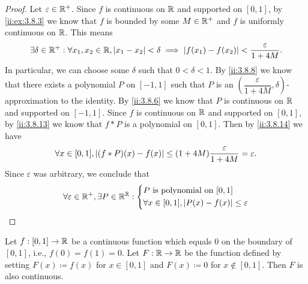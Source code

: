 \begin{proof}
  Let \(\varepsilon \in \mathbb{R}^+\).
  Since \(f\) is continuous on \(\mathbb{R}\) and supported on \([0, 1]\), by \cref{ii:ex:3.8.3} we know that \(f\) is bounded by some \(M \in \mathbb{R}^+\) and \(f\) is uniformly continuous on \(\mathbb{R}\).
  This means
  \[
    \exists \delta \in \mathbb{R}^+ : \forall x_1, x_2 \in \mathbb{R}, \left\lvert x_1 - x_2\right\rvert < \delta \implies \left\lvert f(x_1) - f(x_2)\right\rvert < \dfrac{\varepsilon}{1 + 4M}.
  \]
  In particular, we can choose some \(\delta\) such that \(0 < \delta < 1\).
  By \cref{ii:3.8.8} we know that there exists a polynomial \(P\) on \([-1, 1]\) such that \(P\) is an \((\dfrac{\varepsilon}{1 + 4M}, \delta)\)-approximation to the identity.
  By \cref{ii:3.8.6} we know that \(P\) is continuous on \(\mathbb{R}\) and supported on \([-1, 1]\).
  Since \(f\) is continuous on \(\mathbb{R}\) and supported on \([0, 1]\), by \cref{ii:3.8.13} we know that \(f * P\) is a polynomial on \([0, 1]\).
  Then by \cref{ii:3.8.14} we have
  \[
    \forall x \in [0, 1], \left\lvert(f * P)(x) - f(x)\right\rvert \leq (1 + 4M) \dfrac{\varepsilon}{1 + 4M} = \varepsilon.
  \]
  Since \(\varepsilon\) was arbitrary, we conclude that
  \[
    \forall \varepsilon \in \mathbb{R}^+, \exists P \in \mathbb{R}^{\mathbb{R}} : \begin{dcases}
      P \text{ is polynomial on } [0, 1] \\
      \forall x \in [0, 1], \left\lvert P(x) - f(x)\right\rvert \leq \varepsilon
    \end{dcases}
  \]
\end{proof}

\begin{lem}\label{ii:3.8.16}
  Let \(f : [0, 1] \to \mathbb{R}\) be a continuous function which equals \(0\) on the boundary of \([0, 1]\), i.e., \(f(0) = f(1) = 0\).
  Let \(F : \mathbb{R} \to \mathbb{R}\) be the function defined by setting \(F(x) \coloneqq f(x)\) for \(x \in [0, 1]\) and \(F(x) \coloneqq 0\) for \(x \notin [0, 1]\).
  Then \(F\) is also continuous.
\end{lem}

